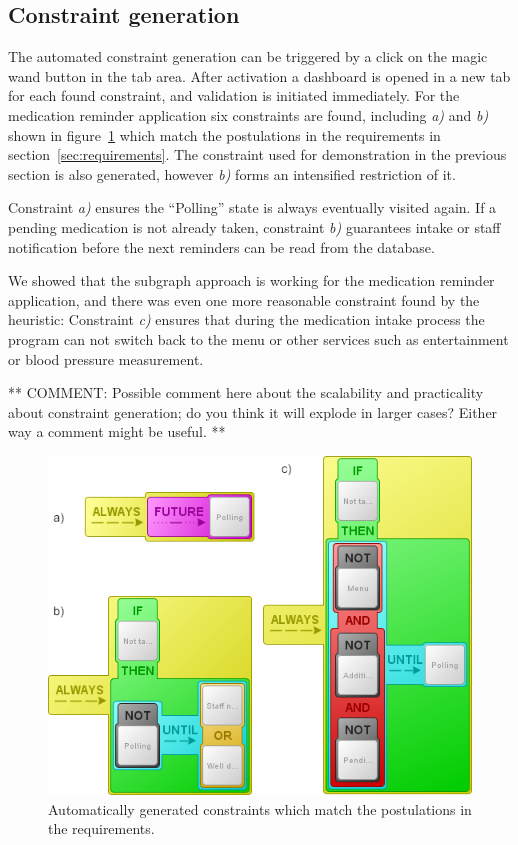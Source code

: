 \documentclass[conference]{IEEEtran}
\begin{document}
\subsection{Constraint generation}
\label{sec:prototypeandevaluation_constraintgeneration}

The automated constraint generation can be triggered by a click on the magic wand button in the tab area. After activation a dashboard is opened in a new tab for each found constraint, and validation is initiated immediately. For the medication reminder application six constraints are found, including \emph{a)} and \emph{b)} shown in figure~\ref{fig:generatedconstraints} which match the postulations in the requirements in section~\ref{sec:requirements}.
The constraint used for demonstration in the previous section is also generated, however \emph{b)} forms an intensified restriction of it.

Constraint \emph{a)} ensures the ``Polling'' state is always eventually visited again. If a pending medication is not already taken, constraint \emph{b)} guarantees intake or staff notification before the next reminders can be read from the database.

We showed that the subgraph approach is working for the medication reminder application, and there was even one more reasonable constraint found by the heuristic: Constraint \emph{c)} ensures that during the medication intake process the program can not switch back to the menu or other services such as entertainment or blood pressure measurement.

** COMMENT: Possible comment here about the scalability and practicality about constraint generation; do you think it will explode in larger cases? Either way a comment might be useful. **

\begin{figure}[htbp]
  \centering
  \includegraphics[width=\linewidth]{generatedconstraints} %
  \caption{Automatically generated constraints which match the postulations in the requirements.}
  \label{fig:generatedconstraints}
\end{figure}
\end{document}
